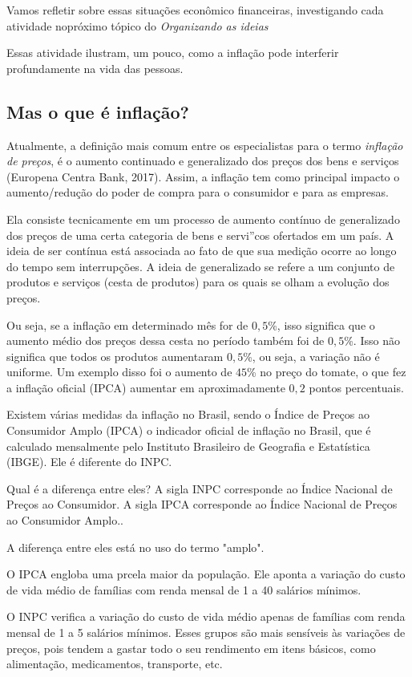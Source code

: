 Vamos refletir sobre essas situações econômico financeiras, investigando cada atividade nopróximo tópico do \textit{Organizando as ideias}

\clearpage
{}
Essas atividade ilustram, um pouco, como a inflação pode interferir profundamente na vida das pessoas. 

\subsection{Mas o que é inflação?}

Atualmente, a definição mais comum entre os especialistas para o termo \textit{inflação de preços}, é o aumento continuado e generalizado dos preços dos bens e serviços (Europena Centra Bank, 2017). Assim, a inflação tem como principal impacto o aumento/redução do poder de compra para o consumidor e para as empresas.

Ela consiste tecnicamente em um processo de aumento contínuo de generalizado dos preços de uma certa categoria de bens e servi''cos ofertados em um país. A ideia de ser contínua está associada ao fato de que sua medição ocorre ao longo do tempo sem interrupções. A ideia de generalizado se refere a um conjunto de produtos e serviços (cesta de produtos) para os quais se olham a evolução dos preços.

 Ou seja, se a inflação em determinado mês for de $0{,}5$\%, isso significa que o aumento médio dos preços dessa cesta no período também foi de $0,5$\%. Isso não significa que todos os produtos aumentaram $0{,}5$\%, ou seja, a variação não é uniforme. Um exemplo disso foi o aumento de $45$\% no preço do tomate, o que fez a inflação oficial (IPCA) aumentar em aproximadamente $0{,}2$ pontos percentuais.

 Existem várias medidas da inflação no Brasil, sendo o Índice de Preços ao Consumidor Amplo (IPCA) o indicador oficial de inflação no Brasil, que é calculado mensalmente pelo Instituto Brasileiro de Geografia e Estatística (IBGE). Ele é diferente do INPC.

\begin{observation}{Qual é a diferença entre eles?}
A sigla INPC corresponde ao Índice Nacional de Preços ao Consumidor. A sigla IPCA corresponde ao Índice Nacional de Preços ao Consumidor Amplo..

A diferença entre eles está no uso do termo "amplo".

O IPCA engloba uma prcela maior da população. Ele aponta a variação do custo de vida médio de famílias com renda mensal de 1 a 40 salários mínimos.

O INPC verifica a variação do custo de vida médio apenas de famílias com renda mensal de 1 a 5 salários mínimos. Esses grupos são mais sensíveis às variações de preços, pois tendem a gastar todo o seu rendimento em itens básicos, como alimentação, medicamentos, transporte, etc.
\end{observation}


